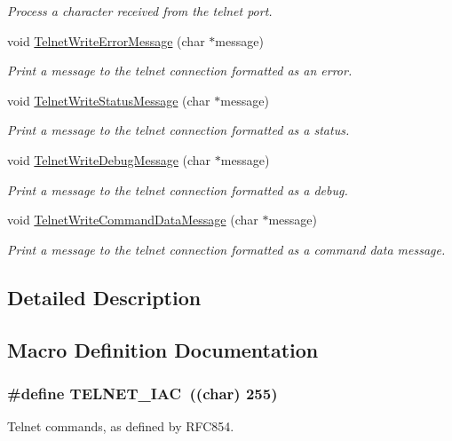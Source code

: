 \begin{DoxyCompactItemize}
\begin{DoxyCompactList}\small\item\em Process a character received from the telnet port. \end{DoxyCompactList}\item 
void \hyperlink{group__telnet__server_ga0660c325387baca6c54fe699ac048907}{Telnet\-Write\-Error\-Message} (char $\ast$message)
\begin{DoxyCompactList}\small\item\em Print a message to the telnet connection formatted as an error. \end{DoxyCompactList}\item 
void \hyperlink{group__telnet__server_ga0afb5de5ce2d81cdc5322e0534bae1d8}{Telnet\-Write\-Status\-Message} (char $\ast$message)
\begin{DoxyCompactList}\small\item\em Print a message to the telnet connection formatted as a status. \end{DoxyCompactList}\item 
void \hyperlink{group__telnet__server_ga7d350b6355ef213d4aa15e9b80c3d15e}{Telnet\-Write\-Debug\-Message} (char $\ast$message)
\begin{DoxyCompactList}\small\item\em Print a message to the telnet connection formatted as a debug. \end{DoxyCompactList}\item 
void \hyperlink{group__telnet__server_ga7f3d87d181908e8353a67bbaf15fac50}{Telnet\-Write\-Command\-Data\-Message} (char $\ast$message)
\begin{DoxyCompactList}\small\item\em Print a message to the telnet connection formatted as a command data message. \end{DoxyCompactList}\end{DoxyCompactItemize}


\subsection{Detailed Description}


\subsection{Macro Definition Documentation}
\hypertarget{group__telnet__server_ga8b600918f84783490fd791ce773175ab}{
\subsubsection[{T\-E\-L\-N\-E\-T\-\_\-\-I\-A\-C}]{\setlength{\rightskip}{0pt plus 5cm}\#define T\-E\-L\-N\-E\-T\-\_\-\-I\-A\-C~((char) 255)}}\label{group__telnet__server_ga8b600918f84783490fd791ce773175ab}
Telnet commands, as defined by R\-F\-C854. 

